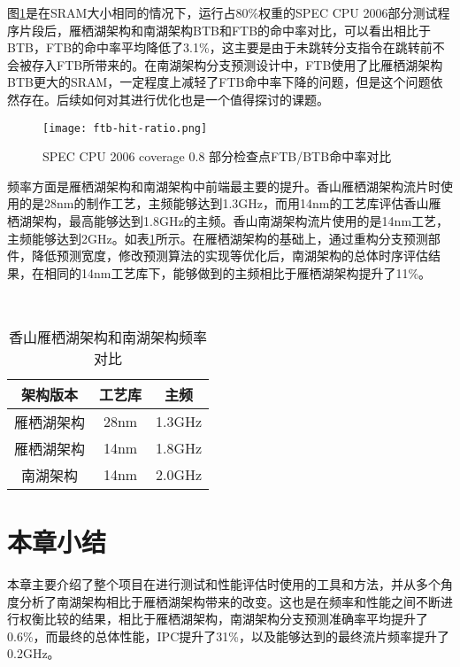 图\ref{fig:figure63}是在SRAM大小相同的情况下，运行占80\%权重的SPEC CPU 2006部分测试程序片段后，雁栖湖架构和南湖架构BTB和FTB的命中率对比，可以看出相比于BTB，FTB的命中率平均降低了3.1\%，这主要是由于未跳转分支指令在跳转前不会被存入FTB所带来的。在南湖架构分支预测设计中，FTB使用了比雁栖湖架构BTB更大的SRAM，一定程度上减轻了FTB命中率下降的问题，但是这个问题依然存在。后续如何对其进行优化也是一个值得探讨的课题。



\begin{figure}[htb]
	\centering
	\setlength\tabcolsep{3pt}  %
	\vspace{5pt} %
	\texttt{[image: ftb-hit-ratio.png]}
	\caption{SPEC CPU 2006 coverage 0.8 部分检查点FTB/BTB命中率对比}
	\label{fig:figure63}
\end{figure}


频率方面是雁栖湖架构和南湖架构中前端最主要的提升。香山雁栖湖架构流片时使用的是28nm的制作工艺，主频能够达到1.3GHz，而用14nm的工艺库评估香山雁栖湖架构，最高能够达到1.8GHz的主频。香山南湖架构流片使用的是14nm工艺，主频能够达到2GHz。如表\ref{tb:table3}所示。在雁栖湖架构的基础上，通过重构分支预测部件，降低预测宽度，修改预测算法的实现等优化后，南湖架构的总体时序评估结果，在相同的14nm工艺库下，能够做到的主频相比于雁栖湖架构提升了11\%。

~\\

\begin{table}[!h]
	\caption{香山雁栖湖架构和南湖架构频率对比}
	\label{tb:table3}
	\centering
    \begin{tabular}{ccc}
        \toprule
        架构版本 & 工艺库 & 主频 \\
        \midrule
        雁栖湖架构 & 28nm & 1.3GHz \\
        雁栖湖架构 & 14nm & 1.8GHz \\
        南湖架构   & 14nm & 2.0GHz \\
        \bottomrule
    \end{tabular}
\end{table}

\section{本章小结}

本章主要介绍了整个项目在进行测试和性能评估时使用的工具和方法，并从多个角度分析了南湖架构相比于雁栖湖架构带来的改变。这也是在频率和性能之间不断进行权衡比较的结果，相比于雁栖湖架构，南湖架构分支预测准确率平均提升了0.6\%，而最终的总体性能，IPC提升了31\%，以及能够达到的最终流片频率提升了0.2GHz。
